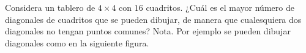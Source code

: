 Considera un tablero de $4 \times 4$ con $16$ cuadritos. ¿Cuál es el mayor número de diagonales de cuadritos que se pueden dibujar, de manera que cualesquiera dos diagonales no tengan puntos comunes?
Nota. Por ejemplo se pueden dibujar diagonales como en la siguiente figura.